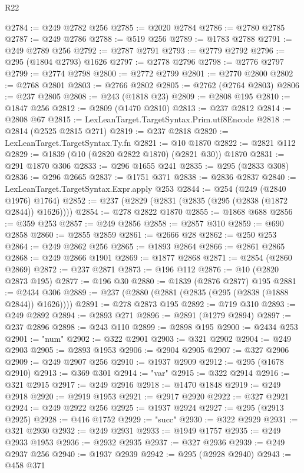 \begin{lexlean}{R22}
\begin{coremodule}
@2784 := @249 @2782 @256
@2785 := @2020 @2784
@2786 := @2780 @2785
@2787 := @249 @2786
@2788 := @519 @256
@2789 := @1783 @2788
@2791 := @249 @2789 @256
@2792 := @2787 @2791
@2793 := @2779 @2792
@2796 := @295 (@1804 @2793) @1626
@2797 := @2778 @2796
@2798 := @2776 @2797
@2799 := @2774 @2798
@2800 := @2772 @2799
@2801 := @2770 @2800
@2802 := @2768 @2801
@2803 := @2766 @2802
@2805 := @2762 (@2764 @2803)
@2806 := @237 @2805
@2808 := @243 (@1818 @23)
@2809 := @2808 @195
@2810 := @1847 @256
@2812 := @2809 (@1470 @2810)
@2813 := @237 @2812
@2814 := @2808 @67
@2815 := LexLeanTarget.TargetSyntax.Prim.utf8Encode
@2818 := @2814 (@2525 @2815 @271)
@2819 := @237 @2818
@2820 := LexLeanTarget.TargetSyntax.Ty.fn
@2821 := @10 @1870
@2822 := @2821 @112
@2829 := @1839 (@10 (@2820 @2822 @1870) (@2821 @30)) @1870
@2831 := @291 @1870 @306
@2833 := @296 @1655 @241
@2835 := @295 (@2833 @308)
@2836 := @296 @2665
@2837 := @1751 @371
@2838 := @2836 @2837
@2840 := LexLeanTarget.TargetSyntax.Expr.apply @253
@2844 := @254 (@249 (@2840 @1976) @1764)
@2852 := @237 (@2829 (@2831 (@2835 (@295 (@2838 (@1872 @2844)) @1626))))
@2854 := @278 @2822 @1870
@2855 := @1868 @688
@2856 := @359 @253
@2857 := @249 @2856
@2858 := @2857 @310
@2859 := @690 @2858
@2860 := @2855 @2859
@2861 := @2666 @28
@2862 := @250 @253
@2864 := @249 @2862 @256
@2865 := @1893 @2864
@2866 := @2861 @2865
@2868 := @249 @2866 @1901
@2869 := @1877 @2868
@2871 := @2854 (@2860 @2869)
@2872 := @237 @2871
@2873 := @196 @112
@2876 := @10 (@2820 @2873 @195)
@2877 := @196 @30
@2880 := @1839 (@2876 @2877) @195
@2881 := @2434 @306
@2889 := @237 (@2880 (@2881 (@2835 (@295 (@2838 (@1888 @2844)) @1626))))
@2891 := @278 @2873 @195
@2892 := @719 @310
@2893 := @249 @2892
@2894 := @2893 @271
@2896 := @2891 (@1279 @2894)
@2897 := @237 @2896
@2898 := @243 @110
@2899 := @2898 @195
@2900 := @2434 @253
@2901 := "num"
@2902 := @322 @2901
@2903 := @321 @2902
@2904 := @249 @2903
@2905 := @2893 @1953
@2906 := @2904 @2905
@2907 := @327 @2906
@2909 := @249 @2907 @256
@2910 := @1937 @2909
@2912 := @295 (@1678 @2910)
@2913 := @369 @301
@2914 := "var"
@2915 := @322 @2914
@2916 := @321 @2915
@2917 := @249 @2916
@2918 := @1470 @1848
@2919 := @249 @2918
@2920 := @2919 @1953
@2921 := @2917 @2920
@2922 := @327 @2921
@2924 := @249 @2922 @256
@2925 := @1937 @2924
@2927 := @295 (@2913 @2925)
@2928 := @416 @1752
@2929 := "succ"
@2930 := @322 @2929
@2931 := @321 @2930
@2932 := @249 @2931
@2933 := @1949 @1757
@2935 := @249 @2933 @1953
@2936 := @2932 @2935
@2937 := @327 @2936
@2939 := @249 @2937 @256
@2940 := @1937 @2939
@2942 := @295 (@2928 @2940)
@2943 := @458 @371

\end{coremodule}
\end{lexlean}
